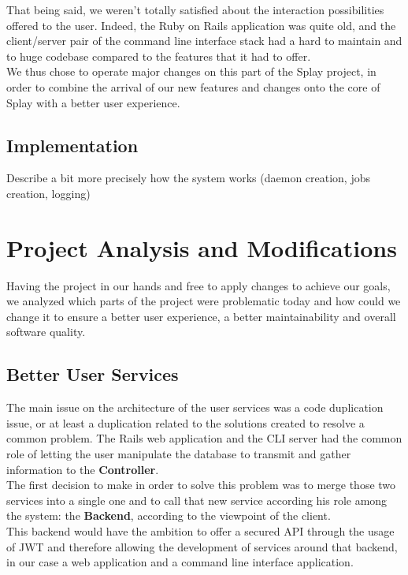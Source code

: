 \documentclass{eplmastersthesis}
\begin{document}
        That being said, we weren't totally satisfied about the interaction
        possibilities offered to the user. Indeed, the Ruby on Rails application
        was quite old, and the client/server pair of the command line interface
        stack had a hard to maintain and to huge codebase compared to the
        features that it had to offer.\\

        We thus chose to operate major changes on this part of the Splay
        project, in order to combine the arrival of our new features and
        changes onto the core of Splay with a better user experience.

      \subsection{Implementation}

        Describe a bit more precisely how the system works (daemon creation,
        jobs creation, logging)

    \section{Project Analysis and Modifications}

      Having the project in our hands and free to apply changes to achieve our
      goals, we analyzed which parts of the project were problematic today and
      how could we change it to ensure a better user experience, a better
      maintainability and overall software quality.

      \subsection{Better User Services}

        The main issue on the architecture of the user services was a code
        duplication issue, or at least a duplication related to the solutions
        created to resolve a common problem. The Rails web application and the
        CLI server had the common role of letting the user manipulate the
        database to transmit and gather information to the \textbf{Controller}.\\

        The first decision to make in order to solve this problem was to
        merge those two services into a single one and to call that new
        service according his role among the system: the \textbf{Backend},
        according to the viewpoint of the client.\\
        This backend would have the ambition to offer a secured API through
        the usage of JWT \cite{JWT} and therefore allowing the development
        of services around that backend, in our case a web application and
        a command line interface application.\\
\end{document}
